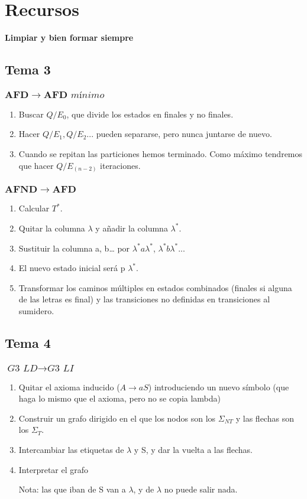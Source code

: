 \documentclass[12pt, twoside, openright]{report} %
\begin{document}
\chapter{Recursos}
\textbf{Limpiar y bien formar siempre}
\section{Tema 3}
\subsection{$\boldsymbol{AFD \rightarrow AFD} \textit{ mínimo}$}
\begin{enumerate}
	\item Buscar $Q/E_0$, que divide los estados en finales y no finales.
	\item Hacer $Q/E_1, Q/E_2...$ pueden separarse, pero nunca juntarse de nuevo.
	\item Cuando se repitan las particiones hemos terminado. Como máximo tendremos que hacer $Q/E_{(n-2)}$ iteraciones.
\end{enumerate}

\subsection{$\boldsymbol{AFND \rightarrow AFD}$}
\begin{enumerate}
	\item Calcular $T^*$.
	\item Quitar la columna $\lambda$ y añadir la columna $\lambda^*$.
	\item Sustituir la columna a, b… por $\lambda^* a \lambda^*$, $\lambda^* b \lambda^*$...
	\item El nuevo estado inicial será p $\lambda^*$.
	\item Transformar los caminos múltiples en estados combinados (finales si alguna de las letras es final) y las transiciones no definidas en transiciones al sumidero.
\end{enumerate}

\section{Tema 4}
\subsection{$\boldsymbol{\textit{G3 LD} \rightarrow \textit{G3 LI}}$}
\begin{enumerate}
	\item Quitar el axioma inducido ($A \rightarrow aS$) introduciendo un nuevo símbolo (que haga lo mismo que el axioma, pero no se copia lambda)
	\item Construir un grafo dirigido en el que los nodos son los $\Sigma_{NT}$ y las flechas son los $\Sigma_T$.
	\item Intercambiar las etiquetas de $\lambda$ y S, y dar la vuelta a las flechas.
	\item Interpretar el grafo

	      Nota: las que iban de S van a $\lambda$, y de $\lambda$ no puede salir nada.
\end{enumerate}
\end{document}
